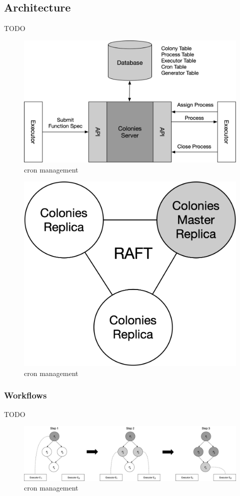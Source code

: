 \documentclass{article}
\begin{document}
\subsection{Architecture}
TODO
\begin{figure}[h]
	\centering
    \includegraphics[scale=0.4]{arch.png}
	\caption{cron management}
	\label{fig:fig1}
\end{figure}

\begin{figure}[h]
	\centering
    \includegraphics[scale=0.4]{raft.png}
	\caption{cron management}
	\label{fig:fig1}
\end{figure}

\subsubsection{Workflows}
TODO
\begin{figure}[h]
	\centering
    \includegraphics[scale=0.32]{workflow.png}
	\caption{cron management}
	\label{fig:fig1}
\end{figure}
\end{document}
